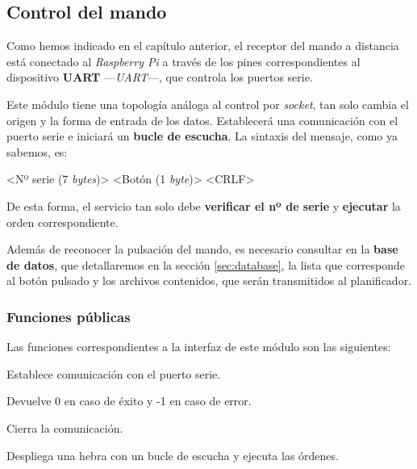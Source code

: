 \smallskip

\subsection{Control del mando}
\label{subsec:daemon_mando}

Como hemos indicado en el capítulo anterior, el receptor del mando a distancia está conectado al \textit{Raspberry Pi} a través de los pines correspondientes al dispositivo \textbf{\acrshort{UART}} ---\textit{\acrlong{UART}}---, que controla los puertos serie. \cite{wiki_uart}

Este módulo tiene una topología análoga al control por \textit{socket}, tan solo cambia el origen y la forma de entrada de los datos. Establecerá una comunicación con el puerto serie e iniciará un \textbf{bucle de escucha}. La sintaxis del mensaje, como ya sabemos, es:

\begin{center}
	<Nº serie (7 \textit{bytes})> <Botón (1 \textit{byte})> <CRLF>
\end{center}

De esta forma, el servicio tan solo debe \textbf{verificar el nº de serie} y \textbf{ejecutar} la orden correspondiente.

Además de reconocer la pulsación del mando, es necesario consultar en la \textbf{base de datos}, que detallaremos en la sección \ref{sec:database}, la lista que corresponde al botón pulsado y los archivos contenidos, que serán transmitidos al planificador.

\subsubsection{Funciones públicas}

Las funciones correspondientes a la interfaz de este módulo son las siguientes:

\begin{description}[style=nextline]
	\item[uart\_init () : \textit{integer}]
	Establece comunicación con el puerto serie.
	
	Devuelve 0 en caso de éxito y -1 en caso de error.
	
	\item[uart\_destroy ()]
	Cierra la comunicación.
	
	\item[uart\_loop ()]
	Despliega una hebra con un bucle de escucha y ejecuta las órdenes.
	
\end{description}


